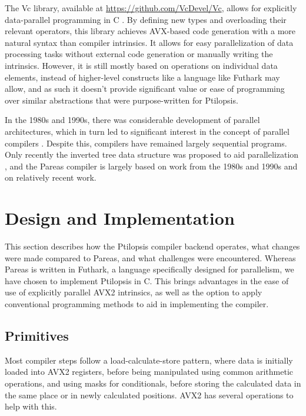 \documentclass[11pt,dvipsnames]{article}
\newcommand{\Rplus}{\protect\hspace{-.1em}\protect\raisebox{.35ex}{\smaller{\smaller\textbf{+}}}}
\newcommand{\Cpp}{\mbox{C\Rplus\Rplus}\xspace}
\begin{document}
The Vc library, available at \url{https://github.com/VcDevel/Vc}, allows for explicitly data-parallel programming in \Cpp \cite{vc} \cite{Kretz2015}. By defining new types and overloading their relevant operators, this library achieves AVX-based code generation with a more natural syntax than compiler intrinsics. It allows for easy parallelization of data processing tasks without external code generation or manually writing the intrinsics. However, it is still mostly based on operations on individual data elements, instead of higher-level constructs like a language like Futhark may allow, and as such it doesn't provide significant value or ease of programming over similar abstractions that were purpose-written for Ptilopsis.

In the 1980s and 1990s, there was considerable development of parallel architectures, which in turn led to significant interest in the concept of parallel compilers \cite{SKILLICORN1993337}. Despite this, compilers have remained largely sequential programs. Only recently the inverted tree data structure was proposed to aid parallelization \cite{hsu2019data}, and the Pareas compiler is largely based on work from the 1980s and 1990s and on relatively recent work.

\section{Design and Implementation}  \label{implementation}

This section describes how the Ptilopsis compiler backend operates, what changes were made compared to Pareas, and what challenges were encountered. Whereas Pareas is written in Futhark, a language specifically designed for parallelism, we have chosen to implement Ptilopsis in \Cpp. This brings advantages in the ease of use of explicitly parallel AVX2 intrinsics, as well as the option to apply conventional programming methods to aid in implementing the compiler.

\subsection{Primitives}
Most compiler steps follow a load-calculate-store pattern, where data is initially loaded into AVX2 registers, before being manipulated using common arithmetic operations, and using masks for conditionals, before storing the calculated data in the same place or in newly calculated positions. AVX2 has several operations to help with this.
\end{document}

